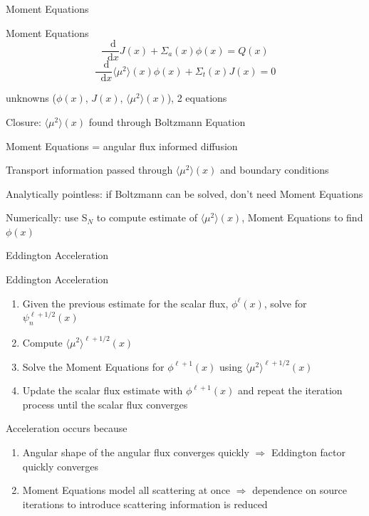 \documentclass[10pt]{beamer}
\newcommand{\SN}{S$_N$\xspace}
\newcommand{\ud}{\mathop{}\!\mathrm{d}} %
\newcommand{\dderiv}[2]{\frac{\ud #1}{\ud #2}}
\newcommand{\edd}{\langle \mu^2 \rangle}
\begin{document}
\begin{frame}{Moment Equations}

	\begin{block}{Moment Equations}
	\begin{equation*}
		\dderiv{}{x} J(x) + \Sigma_a(x) \phi(x) = Q(x) \tag{\footnotesize Zeroth Moment}
	\end{equation*}
	\begin{equation*}
		\dderiv{}{x} \edd(x) \phi(x) 
		+ \Sigma_t(x) J(x) = 0 
		\tag{\footnotesize First Moment}
	\end{equation*}
	\end{block}

	 unknowns ($\phi(x)$, $J(x)$, $\edd(x)$), 2 equations 

	\pause 
	Closure: $\edd(x)$ found through Boltzmann Equation  

	\pause
	Moment Equations = angular flux informed diffusion

	\pause
	Transport information passed through $\edd(x)$ and boundary conditions


	\pause 
	Analytically pointless: if Boltzmann can be solved, don't need Moment Equations 

	\pause 
	Numerically: use \SN to compute estimate of $\edd(x)$, Moment Equations to find $\phi(x)$

\end{frame}

\begin{frame}{Eddington Acceleration}

	\begin{exampleblock}{Eddington Acceleration}
	\begin{enumerate}
		\item Given the previous estimate for the scalar flux, $\phi^{\ell}(x)$, solve for $\psi_n^{\ell+1/2}(x)$

		\item \alert{Compute $\edd^{\ell+1/2}(x)$ }

		\item \alert{Solve the Moment Equations for $\phi^{\ell+1}(x)$ 
			using $\edd^{\ell+1/2}(x)$} 

		\item Update the scalar flux estimate with $\phi^{\ell+1}(x)$ and repeat the iteration process until the scalar flux converges
	\end{enumerate}
	\end{exampleblock}

	\pause
	Acceleration occurs because
	\begin{enumerate}
		\item Angular shape of the angular flux converges quickly $\Rightarrow$ Eddington factor quickly converges 

		\item Moment Equations model all scattering at once $\Rightarrow$ dependence on source iterations to introduce scattering information is reduced 

	\end{enumerate}

\end{frame}
\end{document}
